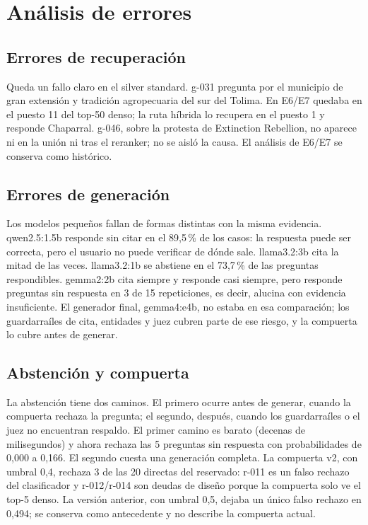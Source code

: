 \section{An\'alisis de errores}
\label{sec:errores}

\subsection{Errores de recuperaci\'on}

Queda un fallo claro en el silver standard. g-031 pregunta por el municipio de gran extensi\'on y tradici\'on agropecuaria del sur del Tolima. En E6/E7 quedaba en el puesto 11 del top-50 denso; la ruta h\'ibrida lo recupera en el puesto 1 y responde Chaparral. g-046, sobre la protesta de Extinction Rebellion, no aparece ni en la uni\'on ni tras el reranker; no se aisl\'o la causa. El an\'alisis de E6/E7 se conserva como hist\'orico.

\subsection{Errores de generaci\'on}

Los modelos peque\~nos fallan de formas distintas con la misma evidencia. qwen2.5:1.5b responde sin citar en el 89,5\,\% de los casos: la respuesta puede ser correcta, pero el usuario no puede verificar de d\'onde sale. llama3.2:3b cita la mitad de las veces. llama3.2:1b se abstiene en el 73,7\,\% de las preguntas respondibles. gemma2:2b cita siempre y responde casi siempre, pero responde preguntas sin respuesta en 3 de 15 repeticiones, es decir, alucina con evidencia insuficiente. El generador final, gemma4:e4b, no estaba en esa comparaci\'on; los guardarra\'iles de cita, entidades y juez cubren parte de ese riesgo, y la compuerta lo cubre antes de generar.

\subsection{Abstenci\'on y compuerta}

La abstenci\'on tiene dos caminos. El primero ocurre antes de generar, cuando la compuerta rechaza la pregunta; el segundo, despu\'es, cuando los guardarra\'iles o el juez no encuentran respaldo. El primer camino es barato (decenas de milisegundos) y ahora rechaza las 5 preguntas sin respuesta con probabilidades de 0,000 a 0,166. El segundo cuesta una generaci\'on completa. La compuerta v2, con umbral 0,4, rechaza 3 de las 20 directas del reservado: r-011 es un falso rechazo del clasificador y r-012/r-014 son deudas de dise\~no porque la compuerta solo ve el top-5 denso. La versi\'on anterior, con umbral 0,5, dejaba un \'unico falso rechazo en 0,494; se conserva como antecedente y no describe la compuerta actual.


